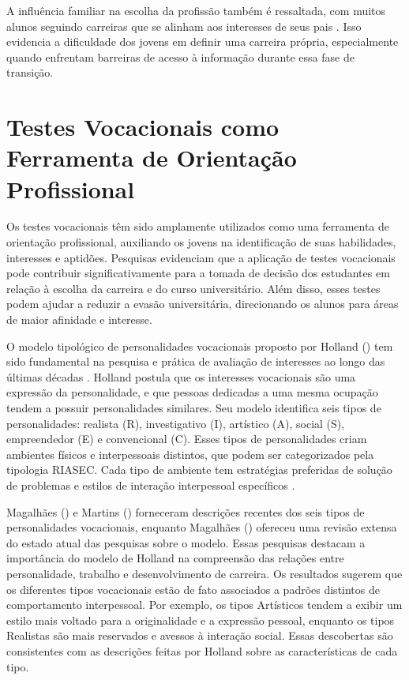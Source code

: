 A influência familiar na escolha da profissão também é ressaltada, com muitos alunos seguindo carreiras que se alinham aos interesses de seus pais  \cite{lopes2022fim}. Isso evidencia a dificuldade dos jovens em definir uma carreira própria, especialmente quando enfrentam barreiras de acesso à informação durante essa fase de transição.


\section{Testes Vocacionais como Ferramenta de Orientação Profissional}

Os testes vocacionais têm sido amplamente utilizados como uma ferramenta de orientação profissional, auxiliando os jovens na identificação de suas habilidades, interesses e aptidões. Pesquisas evidenciam que a aplicação de testes vocacionais pode contribuir significativamente para a tomada de decisão dos estudantes em relação à escolha da carreira e do curso universitário. Além disso, esses testes podem ajudar a reduzir a evasão universitária, direcionando os alunos para áreas de maior afinidade e interesse.

O modelo tipológico de personalidades vocacionais proposto por Holland (\citeyear{holland1997making}) tem sido fundamental na pesquisa e prática de avaliação de interesses ao longo das últimas décadas \cite{de2006relaccao}. Holland postula que os interesses vocacionais são uma expressão da personalidade, e que pessoas dedicadas a uma mesma ocupação tendem a possuir personalidades similares. Seu modelo identifica seis tipos de personalidades: realista (R), investigativo (I), artístico (A), social (S), empreendedor (E) e convencional (C). Esses tipos de personalidades criam ambientes físicos e interpessoais distintos, que podem ser categorizados pela tipologia RIASEC. Cada tipo de ambiente tem estratégias preferidas de solução de problemas e estilos de interação interpessoal específicos \cite{holland1997making}. 

Magalhães (\citeyear{magalhaes2004relacao}) e Martins (\citeyear{martins1978psicologia}) forneceram descrições recentes dos seis tipos de personalidades vocacionais, enquanto Magalhães (\citeyear{de2006relaccao}) ofereceu uma revisão extensa do estado atual das pesquisas sobre o modelo. Essas pesquisas destacam a importância do modelo de Holland na compreensão das relações entre personalidade, trabalho e desenvolvimento de carreira. Os resultados sugerem que os diferentes tipos vocacionais estão de fato associados a padrões distintos de comportamento interpessoal. Por exemplo, os tipos Artísticos tendem a exibir um estilo mais voltado para a originalidade e a expressão pessoal, enquanto os tipos Realistas são mais reservados e avessos à interação social. Essas descobertas são consistentes com as descrições feitas por Holland sobre as características de cada tipo.

